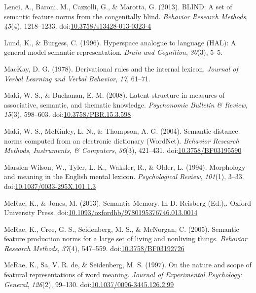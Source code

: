 \documentclass[english,,man]{apa6}
\theoremstyle{definition}
\theoremstyle{definition}
\theoremstyle{definition}
\theoremstyle{remark}
\begin{document}
\hypertarget{ref-Lenci2013}{}
Lenci, A., Baroni, M., Cazzolli, G., \& Marotta, G. (2013). BLIND: A set
of semantic feature norms from the congenitally blind. \emph{Behavior
Research Methods}, \emph{45}(4), 1218--1233.
doi:\href{https://doi.org/10.3758/s13428-013-0323-4}{10.3758/s13428-013-0323-4}

\hypertarget{ref-Lund1996}{}
Lund, K., \& Burgess, C. (1996). Hyperspace analogue to language (HAL):
A general model semantic representation. \emph{Brain and Cognition},
\emph{30}(3), 5--5.

\hypertarget{ref-MacKay1978}{}
MacKay, D. G. (1978). Derivational rules and the internal lexicon.
\emph{Journal of Verbal Learning and Verbal Behavior}, \emph{17},
61--71.

\hypertarget{ref-Maki2008}{}
Maki, W. S., \& Buchanan, E. M. (2008). Latent structure in measures of
associative, semantic, and thematic knowledge. \emph{Psychonomic
Bulletin \& Review}, \emph{15}(3), 598--603.
doi:\href{https://doi.org/10.3758/PBR.15.3.598}{10.3758/PBR.15.3.598}

\hypertarget{ref-Maki2004}{}
Maki, W. S., McKinley, L. N., \& Thompson, A. G. (2004). Semantic
distance norms computed from an electronic dictionary (WordNet).
\emph{Behavior Research Methods, Instruments, \& Computers},
\emph{36}(3), 421--431.
doi:\href{https://doi.org/10.3758/BF03195590}{10.3758/BF03195590}

\hypertarget{ref-Marslen-Wilson1994}{}
Marslen-Wilson, W., Tyler, L. K., Waksler, R., \& Older, L. (1994).
Morphology and meaning in the English mental lexicon.
\emph{Psychological Review}, \emph{101}(1), 3--33.
doi:\href{https://doi.org/10.1037/0033-295X.101.1.3}{10.1037/0033-295X.101.1.3}

\hypertarget{ref-McRae2013}{}
McRae, K., \& Jones, M. (2013). Semantic Memory. In D. Reisberg (Ed.),.
Oxford University Press.
doi:\href{https://doi.org/10.1093/oxfordhb/9780195376746.013.0014}{10.1093/oxfordhb/9780195376746.013.0014}

\hypertarget{ref-McRae2005}{}
McRae, K., Cree, G. S., Seidenberg, M. S., \& McNorgan, C. (2005).
Semantic feature production norms for a large set of living and
nonliving things. \emph{Behavior Research Methods}, \emph{37}(4),
547--559.
doi:\href{https://doi.org/10.3758/BF03192726}{10.3758/BF03192726}

\hypertarget{ref-McRae1997}{}
McRae, K., Sa, V. R. de, \& Seidenberg, M. S. (1997). On the nature and
scope of featural representations of word meaning. \emph{Journal of
Experimental Psychology: General}, \emph{126}(2), 99--130.
doi:\href{https://doi.org/10.1037/0096-3445.126.2.99}{10.1037/0096-3445.126.2.99}
\end{document}
